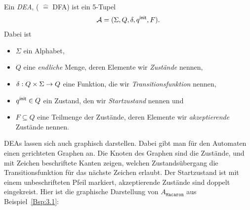 \begin{Def}
        Ein \emph{\acf{DEA}}, ( $\hat=$ \acl{DFA}) ist ein 5-Tupel
        \[ \mathcal{A}= (\Sigma, Q,\delta,q^\mathsf{init},F). \]
Dabei ist
        \begin{itemize}
                \item $\Sigma$ ein Alphabet,
                \item $Q$ eine \emph{endliche} Menge, deren Elemente wir \emph{Zustände} nennen,
                \item $\delta:Q\x\Sigma\->Q$ eine Funktion, die wir \emph{Transitionsfunktion} nennen,
                \item $q^\mathsf{init}\in Q$ ein Zustand, den wir \emph{Startzustand} nennen und
                \item $F\subseteq Q$ eine Teilmenge der Zustände, deren Elemente wir \emph{akzeptierende} Zustände nennen.
                \qedhere
        \end{itemize}
\end{Def}

\acs*{DEA}s lassen sich auch graphisch darstellen.
Dabei gibt man für den Automaten einen gerichteten Graphen an.
Die Knoten des Graphen sind die Zustände, und mit Zeichen beschriftete Kanten zeigen, welchen Zustandsübergang die Transitionsfunktion für das nächste Zeichen erlaubt.
Der Startzustand ist mit einem unbeschrifteten Pfeil markiert, akzeptierende Zustände sind doppelt eingekreist.
Hier ist die graphische Darstellung von $A_{\mathtt{Macaron}}$ aus Beispiel~\ref{Bsp:3.1}:

